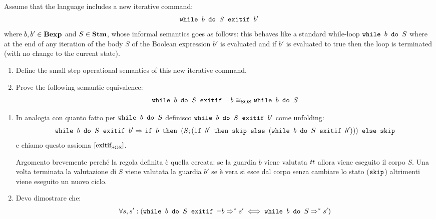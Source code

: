 \newcommand{\exitifSOS}{\SOSRule{exitif}{}{SOS}}
{Assume that the language \while{} includes a new iterative command:
$$
\wbSE{b}{S}{b'}
$$		
where $b, b' \in \bexp$ and $S \in \stm$, whose informal semantics goes as follows:
this behaves like a standard while-loop $\wbS{b}{S}$ where at the end of any iteration
of the body $S$ of the Boolean expression $b'$ is evaluated and if $b'$ is evaluated
to true then the loop is terminated (with no change to the current state).
\begin{enumerate}[label=$\arabic*$.]
	\item Define the small step operational semantics of this new iterative command.
	\item Prove the following semantic equivalence:
	$$
	\wbSE{b}{S}{\neg b} \eqSOS \wbS{b}{S}
	$$
\end{enumerate}
}
{
	\begin{enumerate}
\item In analogia con quanto fatto per $\wbS{b}{S}$ definisco $\wbSE{b}{S}{b'}$ come unfolding:
$$
\wbSE{b}{S}{b'} \Rar{ } \ifABC{b}{(S; (\ifABC{b'}{\skipForFriends}{(\wbSE{b}{S}{b'})}))}{\skipForFriends} 
$$	
e chiamo questo assioma $\exitifSOS$.

Argomento brevemente perché la regola definita è quella cercata:
se la guardia $b$ viene valutata $\semtrue$ allora viene eseguito il corpo
$S$. Una volta terminata la valutazione di $S$ viene valutata la guardia $b'$ se è vera si esce dal corpo senza
cambiare lo stato ($\skipForFriends$) 
altrimenti viene eseguito un nuovo ciclo.
\item Devo dimostrare che:
$$
\forall s, s' : (\wbSE{b}{S}{\neg b} \Rar{*} s' \iff  \wbS{b}{S} \Rar{*} s')
$$
\end{enumerate}
}